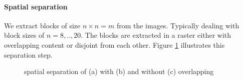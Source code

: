 \paragraph{Spatial separation}
We extract blocks of size $n \times n=m$ from the images. Typically dealing with
block sizes of $n=8,..,20$. The blocks are extracted in a raster either with
overlapping content or disjoint from each other. Figure \ref{fig:separation}
illustrates this separation step. 
\begin{figure}[h]
\centering
{}
\hspace{5mm}
\hspace{5mm}
\caption[spatial separation]{spatial separation of (a) with (b) and without (c)
overlapping}
\label{fig:separation}
\end{figure}

